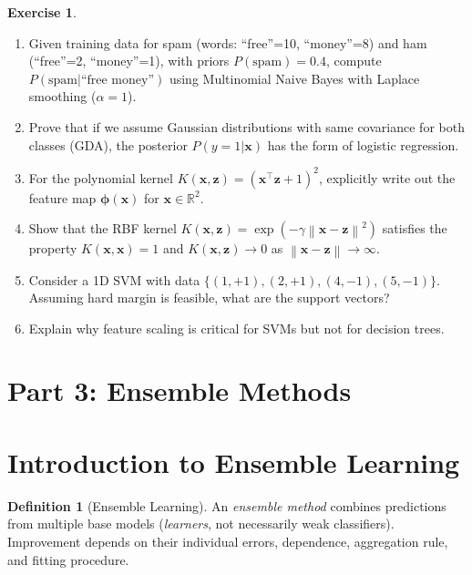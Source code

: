 \documentclass[11pt,twoside]{article}
\numberwithin{equation}{section}
\newcommand{\R}{\mathbb{R}}
\newcommand{\vect}[1]{\bm{#1}}
\newcommand{\norm}[1]{\left\lVert#1\right\rVert}
\theoremstyle{plain}
\theoremstyle{definition}
\newtheorem{definition}[theorem]{Definition}
\newtheorem{exercise}[theorem]{Exercise}
\theoremstyle{remark}
\begin{document}
\begin{exercise}
\begin{enumerate}
\item Given training data for spam (words: ``free''=10, ``money''=8) and ham (``free''=2, ``money''=1), with priors $P(\text{spam})=0.4$, compute $P(\text{spam}|\text{``free money''})$ using Multinomial Naive Bayes with Laplace smoothing ($\alpha=1$).

\item Prove that if we assume Gaussian distributions with same covariance for both classes (GDA), the posterior $P(y=1|\vect{x})$ has the form of logistic regression.

\item For the polynomial kernel $K(\vect{x}, \vect{z}) = (\vect{x}^\top\vect{z} + 1)^2$, explicitly write out the feature map $\vect{\phi}(\vect{x})$ for $\vect{x} \in \R^2$.

\item Show that the RBF kernel $K(\vect{x}, \vect{z}) = \exp(-\gamma\norm{\vect{x}-\vect{z}}^2)$ satisfies the property $K(\vect{x}, \vect{x}) = 1$ and $K(\vect{x}, \vect{z}) \to 0$ as $\norm{\vect{x}-\vect{z}} \to \infty$.

\item Consider a 1D SVM with data $\{(1, +1), (2, +1), (4, -1), (5, -1)\}$. Assuming hard margin is feasible, what are the support vectors?

\item Explain why feature scaling is critical for SVMs but not for decision trees.
\end{enumerate}
\end{exercise}

\section*{Part 3: Ensemble Methods}

\section{Introduction to Ensemble Learning}
\label{sec:ensembles}

\begin{definition}[Ensemble Learning]
An \emph{ensemble method} combines predictions from multiple base models (\emph{learners}, not necessarily weak classifiers). Improvement depends on their individual errors, dependence, aggregation rule, and fitting procedure.
\end{definition}
\end{document}

